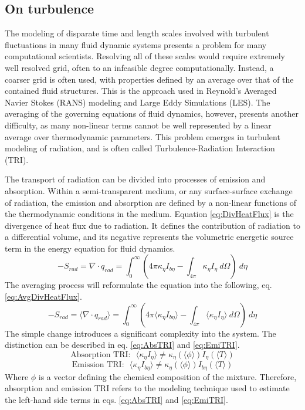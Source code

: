 \subsection{On turbulence}
The modeling of disparate time and length scales involved with turbulent fluctuations in many fluid dynamic systems presents a problem for many computational scientists.
Resolving all of these scales would require extremely well resolved grid, often to an infeasible degree computationally. 
Instead, a coarser grid is often used, with properties defined by an average over that of the contained fluid structures. This is the approach used in Reynold's Averaged Navier Stokes (RANS) modeling and Large Eddy Simulations (LES).
The averaging of the governing equations of fluid dynamics, however, presents another difficulty, as many non-linear terms cannot be well represented by a linear average over thermodynamic parameters.
This problem emerges in turbulent modeling of radiation, and is often called Turbulence-Radiation Interaction (TRI).

The transport of radiation can be divided into processes of emission and absorption. 
Within a semi-transparent medium, or any surface-surface exchange of radiation, the emission and absorption are defined by a non-linear functions of the thermodynamic conditions in the medium.
Equation \ref{eq:DivHeatFlux} is the divergence of heat flux due to radiation. It defines the contribution of radiation to a differential volume, and its negative represents the volumetric energetic source term in the energy equation for fluid dynamics.
\begin{equation}
    -S_{rad}=\nabla\cdot{}q_{rad} = \int_0^\infty{\left(4\pi{}\kappa_\eta{}I_{b\eta{}}-\int_{4\pi}{\kappa{}_\eta{}I_\eta{}~d\Omega{}}\right)~d\eta{}}
    \label{eq:DivHeatFlux}
\end{equation}
The averaging process will reformulate the equation into the following, eq. \ref{eq:AvgDivHeatFlux}.
\begin{equation}
    -S_{rad}=\langle\nabla\cdot{}q_{rad}\rangle = \int_0^\infty{\left(4\pi{}\langle\kappa_\eta{}I_{b\eta{}}\rangle-\int_{4\pi}{\langle\kappa{}_\eta{}I_\eta{}\rangle~d\Omega{}}\right)~d\eta{}}
    \label{eq:AvgDivHeatFlux}
\end{equation}
The simple change introduces a significant complexity into the system. The distinction can be described in eq. \ref{eq:AbsTRI} and \ref{eq:EmiTRI}.
\begin{equation}
    \text{Absorption TRI:~~}\langle\kappa_\eta{}I_{\eta}\rangle \neq \kappa_\eta{}(\langle\phi{}\rangle) I_{\eta}(\langle{}T\rangle{})
    \label{eq:AbsTRI}
\end{equation}
\begin{equation}
    \text{Emission TRI:~~}\langle\kappa_\eta{}I_{b\eta}\rangle \neq \kappa_\eta{}(\langle\phi{}\rangle) I_{b\eta}(\langle{}T\rangle{})
    \label{eq:EmiTRI}
\end{equation}
Where $\phi{}$ is a vector defining the chemical composition of the mixture. Therefore, absorption and emission TRI refers to the modeling technique used to estimate the left-hand side terms in eqs. \ref{eq:AbsTRI} and \ref{eq:EmiTRI}.

